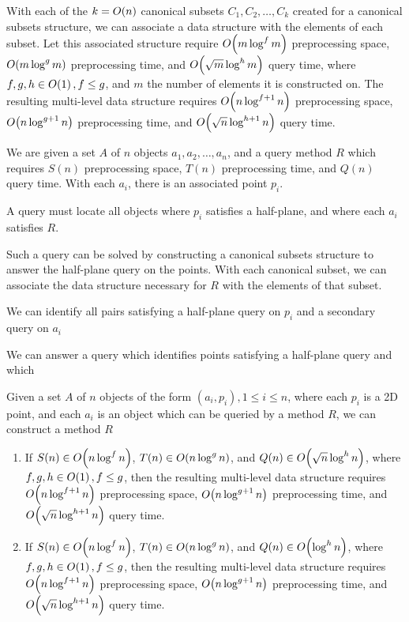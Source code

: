 \begin{corollary}
\label{cor:multichan}

With each of the $k = O\!\left(n\right)$ canonical subsets $C_1, C_2, \ldots, C_k$ created for a canonical subsets structure, we can associate a data structure with the elements of each subset. 
Let this associated structure require $O\!\left(m\log^f{m}\right)$ preprocessing space, $O\!\left(m \log^g{m}\right)$ preprocessing time, and $O\!\left(\sqrt{m}\log^h{m}\right)$ query time, where $f, g, h \in O\!\left(1\right), f \leq g$, and $m$ the number of elements it is constructed on. 
The resulting multi-level data structure requires $O\!\left(n\log^{f+1}{n}\right)$ preprocessing space, $O\!\left(n\log^{g+1}{n}\right)$ preprocessing time, and $O\!\left(\sqrt{n}\log^{h+1}{n}\right)$ query time.


We are given a set $A$ of $n$ objects $a_1, a_2, \ldots, a_n$, and a query method $R$ which requires $S(n)$ preprocessing space, $T(n)$ preprocessing time, and $Q(n)$ query time. With each $a_i$, there is an associated point $p_i$.



A query must locate all objects where $p_i$ satisfies a half-plane, and where each $a_i$ satisfies $R$.

Such a query can be solved by constructing a canonical subsets structure to answer the half-plane query on the points. With each canonical subset, we can associate the data structure necessary for $R$ with the elements of that subset.

We can identify all pairs satisfying a half-plane query on $p_i$ and a secondary query on $a_i$

We can answer a query which identifies points satisfying a half-plane query and which 

Given a set $A$ of $n$ objects of the form $(a_i, p_i), 1 \leq i \leq n$, where each $p_i$ is a 2D point, and each $a_i$ is an object which can be queried by a method $R$, we can construct a method $R$

\begin{enumerate}
\item If $S(n) \in O\!\left(n \log^f{n}\right)$, $T(n) \in O\!\left(n \log^g{n}\right)$, and $Q(n) \in O\!\left(\sqrt{n} \log^h{n}\right)$, where $f, g, h \in O\!\left(1\right), f \leq g$, then the resulting multi-level data structure requires $O\!\left(n\log^{f+1}{n}\right)$ preprocessing space, $O\!\left(n\log^{g+1}{n}\right)$ preprocessing time, and $O\!\left(\sqrt{n}\log^{h+1}{n}\right)$ query time.

\item If $S(n) \in O\!\left(n \log^f{n}\right)$, $T(n) \in O\!\left(n \log^g{n}\right)$, and $Q(n) \in O\!\left(\log^h{n}\right)$, where $f, g, h \in O\!\left(1\right), f \leq g$, then the resulting multi-level data structure requires $O\!\left(n\log^{f+1}{n}\right)$ preprocessing space, $O\!\left(n\log^{g+1}{n}\right)$ preprocessing time, and $O\!\left(\sqrt{n}\log^{h+1}{n}\right)$ query time.

\end{enumerate}

\end{corollary}

